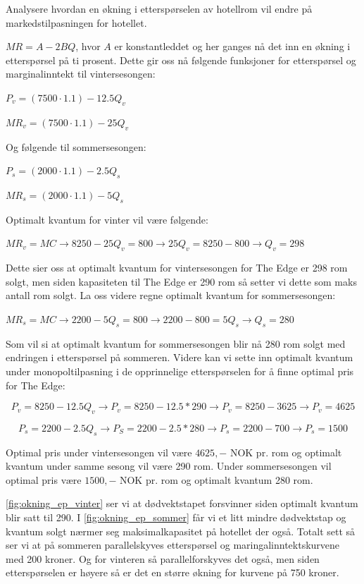 \documentclass[
  12pt,
  a4paper,
  DIV=11,
  numbers=noendperiod]{scrartcl}
\begin{document}
Analysere hvordan en økning i etterspørselen av hotellrom vil endre på
markedstilpasningen for hotellet.

\(MR = A-2BQ\), hvor \(A\) er konstantleddet og her ganges nå det inn en
økning i etterspørsel på ti prosent. Dette gir oss nå følgende
funksjoner for etterspørsel og marginalinntekt til vintersesongen:

\(P_v = (7500 \cdot 1.1) - 12.5Q_v\)

\(MR_v = (7500 \cdot 1.1) - 25Q_v\)

Og følgende til sommersesongen:

\(P_s = (2000 \cdot 1.1) - 2.5Q_s\)

\(MR_s = (2000 \cdot 1.1) - 5Q_s\)

Optimalt kvantum for vinter vil være følgende:

\(MR_v = MC \rightarrow 8250 - 25Q_v = 800 \rightarrow 25Q_v = 8250 - 800 \rightarrow Q_v = 298\)

Dette sier oss at optimalt kvantum for vintersesongen for The Edge er
298 rom solgt, men siden kapasiteten til The Edge er 290 rom så setter
vi dette som maks antall rom solgt. La oss videre regne optimalt kvantum
for sommersesongen:

\(MR_s = MC \rightarrow 2200 - 5Q_s = 800 \rightarrow 2200 - 800 = 5Q_s \rightarrow Q_s = 280\)

Som vil si at optimalt kvantum for sommersesongen blir nå 280 rom solgt
med endringen i etterspørsel på sommeren. Videre kan vi sette inn
optimalt kvantum under monopoltilpasning i de opprinnelige
etterspørselen for å finne optimal pris for The Edge:

\[P_v = 8250 - 12.5Q_v \rightarrow P_v = 8250 - 12.5 * 290 \rightarrow P_v = 8250 - 3625 \rightarrow P_v = 4625\]

\[P_s = 2200 - 2.5Q_s \rightarrow P_S = 2200 - 2.5 * 280 \rightarrow P_s = 2200 - 700 \rightarrow P_s = 1500\]

Optimal pris under vintersesongen vil være \(4625,-\) NOK pr. rom og
optimalt kvantum under samme sesong vil være 290 rom. Under
sommersesongen vil optimal pris være \(1500,-\) NOK pr. rom og optimalt
kvantum 280 rom.

\autoref{fig:okning_ep_vinter} ser vi at dødvektstapet forsvinner siden
optimalt kvantum blir satt til 290. I \autoref{fig:okning_ep_sommer} får
vi et litt mindre dødvektstap og kvantum solgt nærmer seg
maksimalkapasitet på hotellet der også. Totalt sett så ser vi at på
sommeren parallelskyves etterspørsel og maringalinntektskurvene med 200
kroner. Og for vinteren så parallelforskyves det også, men siden
etterspørselen er høyere så er det en større økning for kurvene på 750
kroner.
\end{document}
